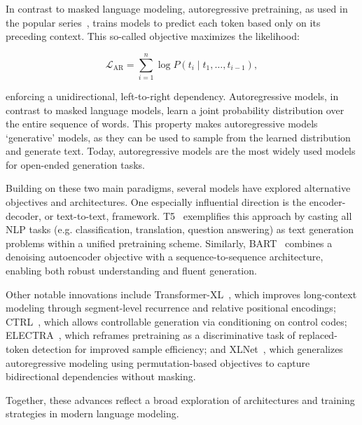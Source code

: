In contrast to masked language modeling, autoregressive pretraining, as used in the popular  series~\citep{radford2018gpt1, radford2019gpt2, brown2020gpt3}, trains models to predict each token based only on its preceding context. This so-called  objective maximizes the likelihood:

\begin{equation}
\mathcal{L}_{\text{AR}} = \sum_{i=1}^n \log P(t_i \mid t_1, \ldots, t_{i-1}),
\label{eq:ar-loss}
\end{equation}

enforcing a unidirectional, left-to-right dependency. Autoregressive models, in contrast to masked language models, learn a joint probability distribution over the entire sequence of words. This property makes autoregressive models `generative' models, as they can be used to sample from the learned distribution and generate text. Today, autoregressive models are the most widely used models for open-ended generation tasks.

Building on these two main paradigms, several models have explored alternative objectives and architectures. One especially influential direction is the encoder-decoder, or text-to-text, framework. T5~\citep{raffel2020t5} exemplifies this approach by casting all NLP tasks (e.g. classification, translation, question answering) as text generation problems within a unified pretraining scheme. Similarly, BART~\citep{lewis2020bart} combines a denoising autoencoder objective with a sequence-to-sequence architecture, enabling both robust understanding and fluent generation.

Other notable innovations include Transformer-XL~\citep{dai2019transformer}, which improves long-context modeling through segment-level recurrence and relative positional encodings; CTRL~\citep{keskar2019ctrl}, which allows controllable generation via conditioning on control codes; ELECTRA~\citep{clark2020electra}, which reframes pretraining as a discriminative task of replaced-token detection for improved sample efficiency; and XLNet~\citep{yang2019xlnet}, which generalizes autoregressive modeling using permutation-based objectives to capture bidirectional dependencies without masking.

Together, these advances reflect a broad exploration of architectures and training strategies in modern language modeling.


